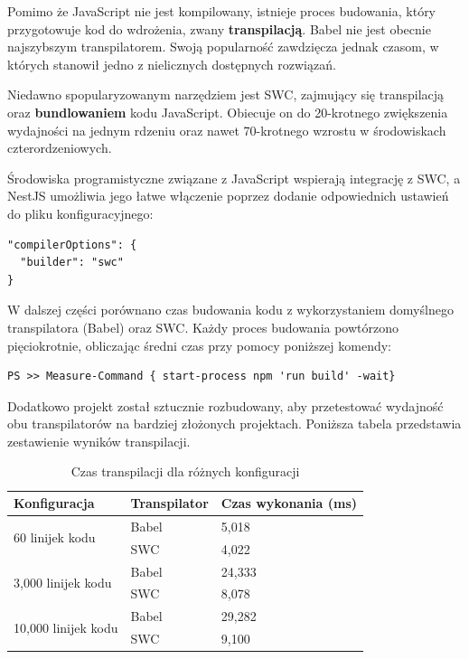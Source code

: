 \documentclass{article}
\begin{document}
Pomimo że JavaScript nie jest kompilowany, istnieje proces budowania, który przygotowuje kod do wdrożenia, zwany \textbf{transpilacją}. Babel nie jest obecnie najszybszym transpilatorem\cite{BabelDailyDev}. Swoją popularność zawdzięcza jednak czasom, w których stanowił jedno z nielicznych dostępnych rozwiązań.

Niedawno spopularyzowanym narzędziem jest SWC, zajmujący się transpilacją oraz \textbf{bundlowaniem} kodu JavaScript. Obiecuje on do 20-krotnego zwiększenia wydajności na jednym rdzeniu oraz nawet 70-krotnego wzrostu w środowiskach czterordzeniowych\cite{BabelLogRocket}.

Środowiska programistyczne związane z JavaScript wspierają integrację z SWC, a NestJS umożliwia jego łatwe włączenie poprzez dodanie odpowiednich ustawień do pliku konfiguracyjnego:

\begin{lstlisting}[caption=Fragment pliku konfiguracyjnego nest-cli.json]
"compilerOptions": {
  "builder": "swc"
}
\end{lstlisting}

W dalszej części porównano czas budowania kodu z wykorzystaniem domyślnego transpilatora (Babel) oraz SWC. Każdy proces budowania powtórzono pięciokrotnie, obliczając średni czas przy pomocy poniższej komendy:

\begin{lstlisting}[caption=Komenda mierząca czas wykonania komendy w systemie Windows]
PS >> Measure-Command { start-process npm 'run build' -wait}
\end{lstlisting}


Dodatkowo projekt został sztucznie rozbudowany, aby przetestować wydajność obu transpilatorów na bardziej złożonych projektach. Poniższa tabela przedstawia zestawienie wyników transpilacji.

\begin{table}[H]
\centering
\begin{tabular}{|l|l|l|}
\hline
\textbf{Konfiguracja} & \textbf{Transpilator} & \textbf{Czas wykonania (ms)} \\ \hline
\multirow{2}{*}{60 linijek kodu} & Babel & 5,018 \\ 
& SWC & 4,022 \\ \hline
\multirow{2}{*}{3,000 linijek kodu} & Babel & 24,333 \\ 
& SWC & 8,078 \\ \hline
\multirow{2}{*}{10,000 linijek kodu} & Babel & 29,282 \\ 
& SWC & 9,100 \\ \hline
\end{tabular}
\caption{Czas transpilacji dla różnych konfiguracji}
\label{tab:czas_wykonania}
\end{table}
\end{document}
